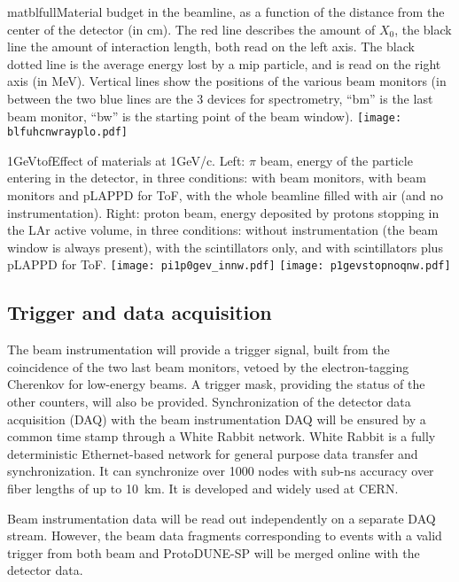   \begin{cdrfigure}{matblfull}{Material budget in the beamline, as a function of the distance from the center of the detector (in cm). The red line describes the amount of $X_0$, the black line the amount of interaction length, both read on the left axis. The black dotted line is the average energy lost by a mip particle, and is read on the right axis (in MeV). Vertical lines show the positions of the various beam monitors (in between the two blue lines are the 3 devices for spectrometry, ``bm'' is the last beam monitor, ``bw'' is the starting point of the beam window).}  
\texttt{[image: blfuhcnwrayplo.pdf]}
\end{cdrfigure}
%
 \begin{cdrfigure}{1GeVtof}{Effect of materials at  1GeV/c. Left: $\pi$ beam, energy of the particle entering in the detector, in three conditions: with  beam monitors, with beam monitors and pLAPPD for ToF, with the whole beamline filled with air (and no instrumentation). Right: proton beam, energy deposited by protons stopping in the LAr active volume, in three conditions: without instrumentation (the beam window is always present), with the scintillators only, and with scintillators plus pLAPPD for ToF.}
\texttt{[image: pi1p0gev\_innw.pdf]}
\texttt{[image: p1gevstopnoqnw.pdf]}
\end{cdrfigure}



\subsection {Trigger and data acquisition}

The beam instrumentation will provide a trigger signal, built from the coincidence of the two last beam monitors, vetoed by the electron-tagging Cherenkov for low-energy beams. 
A trigger mask, providing the status of the other counters, will also be provided. 
 Synchronization of the detector data acquisition (DAQ) with the beam instrumentation DAQ will be ensured by a common time stamp through a White Rabbit network.
 White Rabbit is a fully deterministic Ethernet-based network for general purpose data transfer and synchronization. It can synchronize over 1000 nodes with sub-ns accuracy over fiber lengths of up to 10~km. It is developed and widely used at CERN.  

Beam instrumentation data will be read out independently on a separate DAQ stream. However,  
the beam data fragments corresponding to  events with a valid trigger from both beam and ProtoDUNE-SP will be merged online with the detector data.
 
